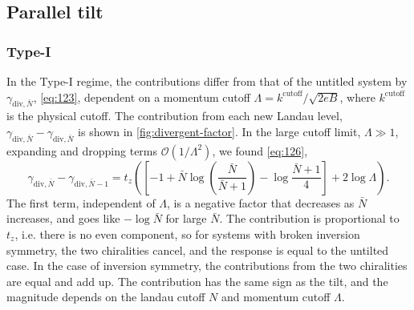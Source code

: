 \FloatBarrier
\subsection{Parallel tilt}
\subsubsection{Type-I}
In the Type-I regime, the contributions differ from that of the untitled system by \( \gamma_{\text{div}, \bar{N}} \), \cref{eq:123}, dependent on a momentum cutoff \( \Lambda = k^{\text{cutoff}} /\sqrt{2 e B}  \), where \(k^{\text{cutoff}}\) is the physical cutoff.
The contribution from each new Landau level, \( \gamma_{\text{div}, \bar{N}}-\gamma_{\text{div}, \bar{N}} \) is shown in \cref{fig:divergent-factor}.
In the large cutoff limit, \( \Lambda \gg 1 \), expanding and dropping terms \( \mathcal{O}(1 /\Lambda^2) \), we found \cref{eq:126},
\[
  \gamma_{\text{div}, \bar{N}} - \gamma_{\text{div}, \bar{N}-1} =
  t_z
  \left(
    \left[
      -1 + \bar{N} \log\left(\frac{\bar{N}}{\bar{N}+1}\right) - \log \frac{\bar{N}+1}{4}
    \right]
    + 2 \log\Lambda
  \right).
\]
The first term, independent of \( \Lambda \), is a negative factor that decreases as \( \bar{N} \) increases, and goes like \( -\log \bar{N} \) for large \( \bar{N} \).
The contribution is proportional to \( t_z \), i.e. there is no even component, so for systems with broken inversion symmetry, the two chiralities cancel, and the response is equal to the untilted case.
In the case of inversion symmetry, the contributions from the two chiralities are equal and add up.
The contribution has the same sign as the tilt, and the magnitude depends on the landau cutoff \( N \) and momentum cutoff \( \Lambda \).


